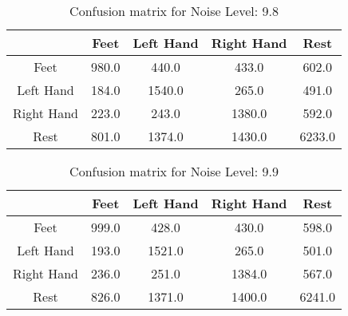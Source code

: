 \begin{table}[!htbp]
    \centering
    \begin{tabular}{|c||c|c|c|c|}
        \hline
		 & Feet & Left Hand & Right Hand & Rest \\
        \hline
        \hline
        Feet & 980.0 & 440.0 & 433.0 & 602.0 \\
        \hline
        Left Hand & 184.0 & 1540.0 & 265.0 & 491.0 \\
        \hline
        Right Hand & 223.0 & 243.0 & 1380.0 & 592.0 \\
        \hline
        Rest & 801.0 & 1374.0 & 1430.0 & 6233.0 \\
        \hline
    \end{tabular}
    \caption{Confusion matrix for Noise Level: 9.8}
\end{table}

\begin{table}[!htbp]
    \centering
    \begin{tabular}{|c||c|c|c|c|}
        \hline
		 & Feet & Left Hand & Right Hand & Rest \\
        \hline
        \hline
        Feet & 999.0 & 428.0 & 430.0 & 598.0 \\
        \hline
        Left Hand & 193.0 & 1521.0 & 265.0 & 501.0 \\
        \hline
        Right Hand & 236.0 & 251.0 & 1384.0 & 567.0 \\
        \hline
        Rest & 826.0 & 1371.0 & 1400.0 & 6241.0 \\
        \hline
    \end{tabular}
    \caption{Confusion matrix for Noise Level: 9.9}
\end{table}